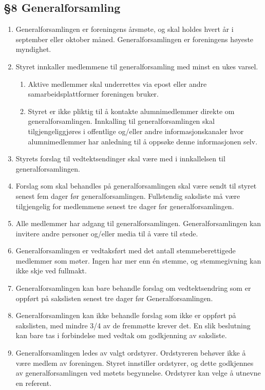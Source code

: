\documentclass[a4paper,11pt,titlepage]{article}
\begin{document}
\subsection*{§8 Generalforsamling}
\begin{enumerate}
\item Generalforsamlingen er foreningens årsmøte, og skal holdes hvert år i september eller oktober måned. Generalforsamlingen er foreningens høyeste myndighet.

\item Styret innkaller medlemmene til generalforsamling med minst en ukes varsel. 

\begin{enumerate}
\item Aktive medlemmer skal underrettes via epost eller andre samarbeidsplattformer foreningen bruker. 
\item Styret er ikke pliktig til å kontakte alumnimedlemmer direkte om generalforsamlingen. Innkalling til generalforsamlingen skal tilgjengeliggjøres i offentlige og/eller andre informasjonskanaler hvor alumnimedlemmer har anledning til å oppsøke denne informasjonen selv. 
\end{enumerate}

\item Styrets forslag til vedtektsendinger skal være med i innkallelsen til generalforsamlingen.

\item Forslag som skal behandles på generalforsamlingen skal være sendt til styret senest fem dager før generalforsamlingen. Fullstendig saksliste må være tilgjengelig for medlemmene senest tre dager før generalforsamlingen.

\item Alle medlemmer har adgang til generalforsamlingen. Generalforsamlingen kan invitere andre personer og/eller media til å være til stede.

\item Generalforsamlingen er vedtaksført med det antall stemmeberettigede medlemmer som møter. Ingen har mer enn én stemme, og stemmegivning kan ikke skje ved fullmakt.

\item Generalforsamlingen kan bare behandle forslag om vedtektsendring som er oppført på sakslisten senest tre dager før Generalforsamlingen.

\item Generalforsamlingen kan ikke behandle forslag som ikke er oppført på sakslisten, med mindre 3/4 av de fremmøtte krever det. En slik beslutning kan bare tas i forbindelse med vedtak om godkjenning av saksliste.

\item Generalforsamlingen ledes av valgt ordstyrer. Ordstyreren behøver ikke å være medlem av foreningen. Styret innstiller ordstyrer, og dette godkjennes av generalforsamlingen ved møtets begynnelse. Ordstyrer kan velge å utnevne en referent.

\end{enumerate}
\end{document}

